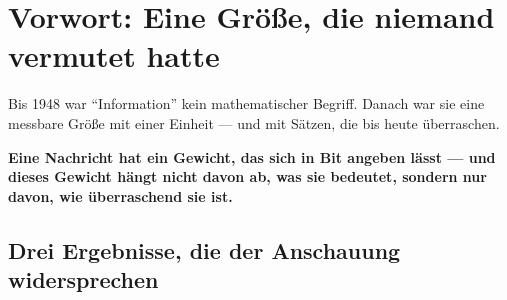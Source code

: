 \chapter*{Vorwort: Eine Größe, die niemand vermutet hatte}

Bis 1948 war \enquote{Information} kein mathematischer Begriff. Danach war sie eine messbare Größe mit einer Einheit --- und mit Sätzen, die bis heute überraschen.

\begin{merksatz}
\begin{center}
\begin{minipage}{0.9\textwidth}
\textbf{Eine Nachricht hat ein Gewicht, das sich in Bit angeben lässt --- und dieses Gewicht hängt nicht davon ab, was sie bedeutet, sondern nur davon, wie überraschend sie ist.}
\end{minipage}
\end{center}

\begin{center}
\begin{minipage}{0.88\textwidth}
\end{minipage}
\end{center}
\end{merksatz}

\section*{Drei Ergebnisse, die der Anschauung widersprechen}

